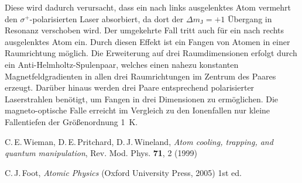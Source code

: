 \documentclass[twocolumn]{revtex4}
\begin{document}
Diese wird dadurch verursacht, dass ein nach links ausgelenktes Atom vermehrt den $\sigma^+$-polarisierten Laser absorbiert, da dort der $\Delta m_\mathrm{J} = +1$ Übergang in Resonanz verschoben wird. Der umgekehrte Fall tritt auch für ein nach rechts ausgelenktes Atom ein.
Durch diesen Effekt ist ein Fangen von Atomen in einer Raumrichtung möglich.
Die Erweiterung auf drei Raumdimensionen erfolgt durch ein Anti-Helmholtz-Spulenpaar, welches einen nahezu konstanten Magnetfeldgradienten in allen drei Raumrichtungen im Zentrum des Paares erzeugt.
Darüber hinaus werden drei Paare entsprechend polarisierter Laserstrahlen benötigt, um Fangen in drei Dimensionen zu ermöglichen.
Die magneto-optische Falle erreicht im Vergleich zu den Ionenfallen nur kleine Fallentiefen der Größenordnung \SI{1}{K}.

\begin{thebibliography}{}
C.\,E.\,Wieman, D.\,E.\,Pritchard, D.\,J.\,Wineland, {\it Atom cooling, trapping, and quantum manipulation}, Rev. Mod. Phys. \textbf{71}, 2 (1999)

C.\,J.\,Foot, {\it Atomic Physics} (Oxford University Press, 2005) 1st ed.

\end{thebibliography}
\end{document}
